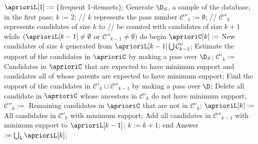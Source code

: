 $\aprioriL[1] := \{$frequent 1-itemsets$\}$;
Generate $\D_S$, a sample of the database, in the first pass;
$k := 2$; // $k$ represents the pass number
$\mathcal{C}''_1 := \emptyset$; // $\mathcal{C}''_k$ represents candidates of size $k$ to
             // be counted with candidates of size $k+1$
while $(\aprioriL[k-1] \neq \emptyset$ or $\mathcal{C}''_{k-1} \neq \emptyset)$ do begin
	$\aprioriC[k] := $ New candidates of size $k$ generated from $\aprioriL[k-1] \bigcup \mathcal{C}''_{k-1}$;
	Estimate the support of the candidates in $\aprioriC$ by making a pass over $\D_S$;
	$\mathcal{C}'_k:=$ Candidates in $\aprioriC$ that are expected to have minimum support and
       candidates all of whose parents are expected to have minimum support;
	Find the support of the candidates in $\mathcal{C}'_k\cup \mathcal{C}''_{k-1}$ by making a pass over $\D$;
	Delete all candidate in $\aprioriC$ whose ancestors in $\mathcal{C}'_k$ do not have minimum support;
	$\mathcal{C}''_k:=$ Remaining candidates in $\aprioriC$ that are not in $\mathcal{C}'_k$;
	$\aprioriL[k]:=$ All candidates in $\mathcal{C}'_k$ with minimum support;
	Add all candidates in $\mathcal{C}''_{k-1}$ with minimum support to $\aprioriL[k-1]$;
	$k := k+1$;
end
Answer $:=\bigcup_k{\aprioriL[k]}$;

